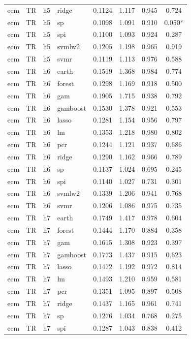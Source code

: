 \begin{ThreePartTable}
\begin{longtable}[t]{llclcccc}
ecm & TR & h5 & ridge & 0.1124 & 1.117 & 0.945 & 0.724\\
ecm & TR & h5 & sp & 0.1098 & 1.091 & 0.910 & 0.050*\\
ecm & TR & h5 & spi & 0.1100 & 1.093 & 0.924 & 0.287\\
ecm & TR & h5 & svmlw2 & 0.1205 & 1.198 & 0.965 & 0.919\\
ecm & TR & h5 & svmr & 0.1119 & 1.113 & 0.976 & 0.588\\
\addlinespace
ecm & TR & h6 & earth & 0.1519 & 1.368 & 0.984 & 0.774\\
ecm & TR & h6 & forest & 0.1298 & 1.169 & 0.918 & 0.500\\
ecm & TR & h6 & gam & 0.1905 & 1.715 & 0.938 & 0.792\\
ecm & TR & h6 & gamboost & 0.1530 & 1.378 & 0.921 & 0.553\\
ecm & TR & h6 & lasso & 0.1281 & 1.154 & 0.956 & 0.797\\
ecm & TR & h6 & lm & 0.1353 & 1.218 & 0.980 & 0.802\\
ecm & TR & h6 & pcr & 0.1244 & 1.121 & 0.937 & 0.686\\
ecm & TR & h6 & ridge & 0.1290 & 1.162 & 0.966 & 0.789\\
ecm & TR & h6 & sp & 0.1137 & 1.024 & 0.695 & 0.245\\
ecm & TR & h6 & spi & 0.1140 & 1.027 & 0.731 & 0.301\\
ecm & TR & h6 & svmlw2 & 0.1339 & 1.206 & 0.941 & 0.768\\
ecm & TR & h6 & svmr & 0.1206 & 1.086 & 0.975 & 0.735\\
\addlinespace
ecm & TR & h7 & earth & 0.1749 & 1.417 & 0.978 & 0.604\\
ecm & TR & h7 & forest & 0.1444 & 1.170 & 0.884 & 0.358\\
ecm & TR & h7 & gam & 0.1615 & 1.308 & 0.923 & 0.397\\
ecm & TR & h7 & gamboost & 0.1773 & 1.437 & 0.915 & 0.623\\
ecm & TR & h7 & lasso & 0.1472 & 1.192 & 0.972 & 0.814\\
ecm & TR & h7 & lm & 0.1493 & 1.210 & 0.959 & 0.581\\
ecm & TR & h7 & pcr & 0.1351 & 1.095 & 0.897 & 0.508\\
ecm & TR & h7 & ridge & 0.1437 & 1.165 & 0.961 & 0.741\\
ecm & TR & h7 & sp & 0.1276 & 1.034 & 0.768 & 0.275\\
ecm & TR & h7 & spi & 0.1287 & 1.043 & 0.838 & 0.412\\

\end{longtable}
\end{ThreePartTable}
